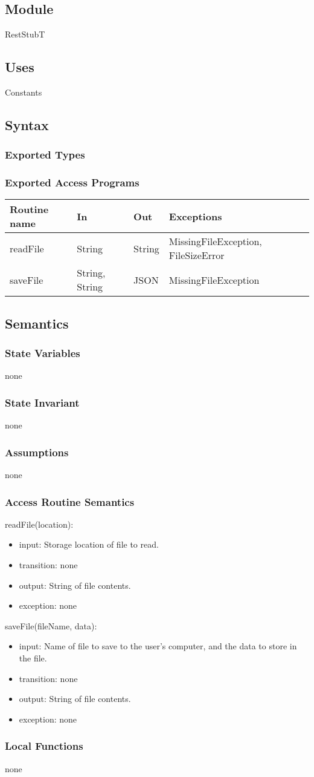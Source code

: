 \documentclass[12pt, titlepage]{article}
\newcommand{\newModule}[9]{
	\subsection* {Module}
		#1
	\subsection* {Uses}
		#2
	\subsection* {Syntax}
		\subsubsection* {Exported Types}
			#3
		\subsubsection* {Exported Access Programs}
			#4
	\subsection* {Semantics}
		\subsubsection* {State Variables}
			#5
		\subsubsection* {State Invariant}
			#6
		\subsubsection* {Assumptions}
			#7
		\subsubsection* {Access Routine Semantics}
			#8
		\subsubsection* {Local Functions}
			#9
}
\newcommand{\newAccessProgram}[5]{
	\noindent #1:
		\begin{itemize}
		    \item input: #2
			\item transition: #3
			\item output: #4
			\item exception: #5
		\end{itemize}
}
\newcommand{\row}[4]{#1 & #2 & #3 & #4 ~\\ \hline}
\newcommand{\accessProgramsTableStart}{
\begin{tabular}{| l | l | l | l |}
\hline
\textbf{Routine name} & \textbf{In} & \textbf{Out} & \textbf{Exceptions}\\
\hline
}
\newcommand{\accessProgramsTableEnd}{
	\end{tabular}
}
\begin{document}
\newModule{RestStubT}
	{%
		Constants
	}
	{%
		
	}
	{%
		\accessProgramsTableStart
			\row{readFile}{String}{String}{MissingFileException, FileSizeError}
			\row{saveFile}{String, String}{JSON}{MissingFileException}
		\accessProgramsTableEnd
	}
	{%
		none \\

		 
	}
	{%
        none
	}
	{%
		none
	}
	{%
		\newAccessProgram{readFile(location)}
			{%
				Storage location of file to read.
			}
			{%
				none
			}
			{%
				String of file contents.
			}
			{%
				none
			}
		\newAccessProgram{saveFile(fileName, data)}
			{%
				Name of file to save to the user's computer, and the data to store in the file.
			}
			{%
				none
			}
			{%
				String of file contents.
			}
			{%
				none
			}
	}
	{%
		none
	}
	
\newpage
\end{document}
